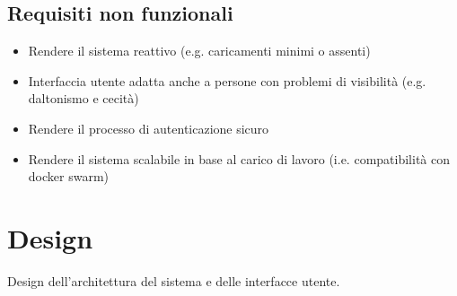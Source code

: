 \documentclass{report}
\begin{document}
\subsection{Requisiti non funzionali}
\begin{itemize}
\item Rendere il sistema reattivo (e.g. caricamenti minimi o assenti)
\item Interfaccia utente adatta anche a persone con problemi di visibilità (e.g. daltonismo e cecità)
\item Rendere il processo di autenticazione sicuro
\item Rendere il sistema scalabile in base al carico di lavoro (i.e. compatibilità con docker swarm)
\end{itemize}


\section{Design}
Design dell'architettura del sistema e delle interfacce utente.
\end{document}
